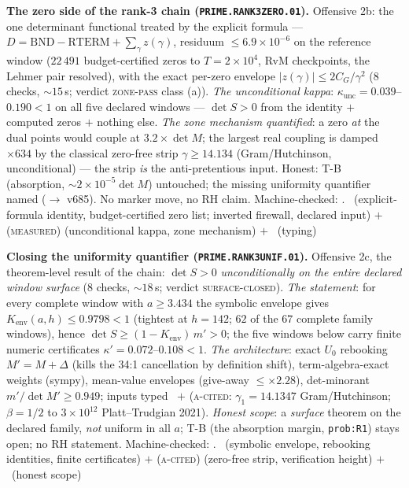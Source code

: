 \documentclass[11pt,a4paper]{article}
\theoremstyle{definition}
\begin{document}
\par\smallskip\noindent\textbf{The zero side of the rank-3 chain
(\texttt{PRIME.RANK3ZERO.01}).}
Offensive 2b: the one determinant functional treated by the explicit
formula --- $D=\mathrm{BND}-\mathrm{RTERM}+\sum_\gamma z(\gamma)$,
residuum $\le6.9\times10^{-6}$ on the reference window ($22\,491$
budget-certified zeros to $T=2\times10^{4}$, RvM checkpoints, the
Lehmer pair resolved), with the exact per-zero envelope
$|z(\gamma)|\le2C_G/\gamma^2$ ($8$ checks, ${\sim}15$\,s; verdict
\textsc{zone-pass} class (a)).  \emph{The unconditional kappa}:
$\kappa_{\mathrm{unc}}=0.039$--$0.190<1$ on all five declared
windows --- $\det S>0$ from the identity $+$ computed zeros $+$
nothing else.  \emph{The zone mechanism quantified}: a zero
\emph{at} the dual points would couple at $3.2\times\det M$; the
largest real coupling is damped $\times634$ by the classical
zero-free strip $\gamma\ge14.134$ (Gram/Hutchinson, unconditional)
--- the strip \emph{is} the anti-pretentious input.  Honest: T-B
(absorption, $\sim2\times10^{-5}\det M$) untouched; the missing
uniformity quantifier named ($\to$ v685).  No marker move, no RH
claim.
Machine-checked: .
\mE\ (explicit-formula identity, budget-certified zero list;
inverted firewall, declared input) $+$ (\textsc{measured})
(unconditional kappa, zone mechanism) $+$ \mC\ (typing)
\par\smallskip

\par\smallskip\noindent\textbf{Closing the uniformity quantifier
(\texttt{PRIME.RANK3UNIF.01}).}
Offensive 2c, the theorem-level result of the chain: $\det S>0$
\emph{unconditionally on the entire declared window surface} ($8$
checks, ${\sim}18$\,s; verdict \textsc{surface-closed}).  \emph{The
statement}: for every complete window with $a\ge3.434$ the symbolic
envelope gives $K_{\mathrm{env}}(a,h)\le0.9798<1$ (tightest at
$h=142$; $62$ of the $67$ complete family windows), hence $\det
S\ge(1-K_{\mathrm{env}})\,m'>0$; the five windows below carry finite
numeric certificates $\kappa'=0.072$--$0.108<1$.  \emph{The
architecture}: exact $U_0$ rebooking $M'=M+\Delta$ (kills the 34:1
cancellation by definition shift), term-algebra-exact weights
(sympy), mean-value envelopes (give-away $\le\times2.28$),
det-minorant $m'/\det M'\ge0.949$; inputs typed \mE\ $+$
(\textsc{a-cited}: $\gamma_1=14.1347$ Gram/Hutchinson; $\beta=1/2$
to $3\times10^{12}$ Platt--Trudgian 2021).  \emph{Honest scope}: a
\emph{surface} theorem on the declared family, \emph{not} uniform in
all $a$; T-B (the absorption margin, \texttt{prob:R1}) stays open;
no RH statement.
Machine-checked: .
\mE\ (symbolic envelope, rebooking identities, finite certificates)
$+$ (\textsc{a-cited}) (zero-free strip, verification height) $+$
\mC\ (honest scope)
\par\smallskip
\end{document}
